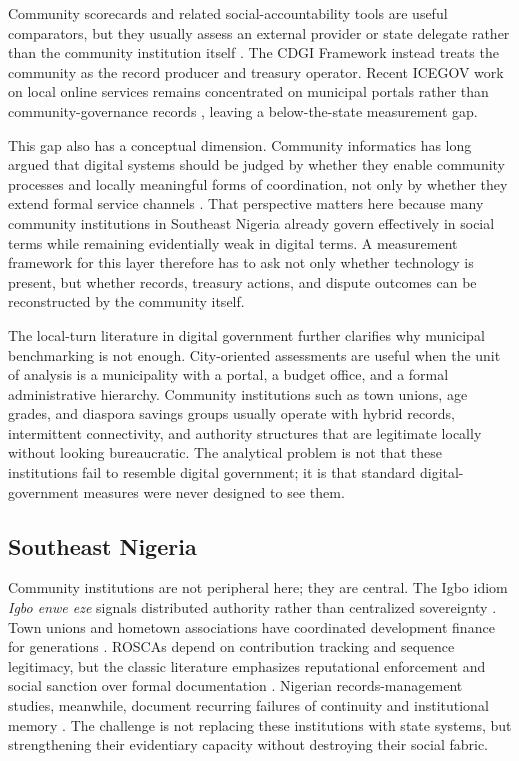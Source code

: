 \documentclass[sigconf,anonymous]{acmart}
\begin{document}
Community scorecards and related social-accountability tools are useful comparators, but they usually assess an external provider or state delegate rather than the community institution itself \cite{cooke2001,bjorkman2009}. The CDGI Framework instead treats the community as the record producer and treasury operator. Recent ICEGOV work on local online services remains concentrated on municipal portals rather than community-governance records \cite{gasco2017,janowski2015}, leaving a below-the-state measurement gap.

This gap also has a conceptual dimension. Community informatics has long argued that digital systems should be judged by whether they enable community processes and locally meaningful forms of coordination, not only by whether they extend formal service channels \cite{gurstein2007}. That perspective matters here because many community institutions in Southeast Nigeria already govern effectively in social terms while remaining evidentially weak in digital terms. A measurement framework for this layer therefore has to ask not only whether technology is present, but whether records, treasury actions, and dispute outcomes can be reconstructed by the community itself.

The local-turn literature in digital government further clarifies why municipal benchmarking is not enough. City-oriented assessments are useful when the unit of analysis is a municipality with a portal, a budget office, and a formal administrative hierarchy. Community institutions such as town unions, age grades, and diaspora savings groups usually operate with hybrid records, intermittent connectivity, and authority structures that are legitimate locally without looking bureaucratic. The analytical problem is not that these institutions fail to resemble digital government; it is that standard digital-government measures were never designed to see them.

\subsection{Southeast Nigeria}

Community institutions are not peripheral here; they are central. The Igbo idiom \textit{Igbo enwe eze} signals distributed authority rather than centralized sovereignty \cite{okafor1992}. Town unions and hometown associations have coordinated development finance for generations \cite{honey1998}. ROSCAs depend on contribution tracking and sequence legitimacy, but the classic literature emphasizes reputational enforcement and social sanction over formal documentation \cite{ardener1964,besley1993}. Nigerian records-management studies, meanwhile, document recurring failures of continuity and institutional memory \cite{abioye2007}. The challenge is not replacing these institutions with state systems, but strengthening their evidentiary capacity without destroying their social fabric.
\end{document}
